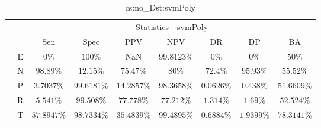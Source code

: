\begin{table}[!ht]
	\centering
	\begin{tabular}{|c|c|c|c|c|c|c|c|c|}
		\cline{3-9}
		\multicolumn{2}{c|}{} & \multicolumn{7}{c|}{Statistics - svmPoly} \\ \cline{3-9}
		\multicolumn{2}{c|}{} & Sen & Spec & PPV & NPV & DR & DP & BA \\ \hline
		\multirow{5}{*}{\rotatebox{90}{Class}} & E & $0\%$ & $100\%$ & NaN & $99.8123\%$ & $0\%$ & $0\%$ & $50\%$ \\ \cline{2-9}
		 & N & $98.89\%$ & $12.15\%$ & $75.47\%$ & $80\%$ & $72.4\%$ & $95.93\%$ & $55.52\%$ \\ \cline{2-9}
		 & P & $3.7037\%$ & $99.6181\%$ & $14.2857\%$ & $98.3658\%$ & $0.0626\%$ & $0.438\%$ & $51.6609\%$ \\ \cline{2-9}
		 & R & $5.541\%$ & $99.508\%$ & $77.778\%$ & $77.212\%$ & $1.314\%$ & $1.69\%$ & $52.524\%$ \\ \cline{2-9}
		 & T & $57.8947\%$ & $98.7334\%$ & $35.4839\%$ & $99.4895\%$ & $0.6884\%$ & $1.9399\%$ & $78.3141\%$ \\ \hline
	\end{tabular}
	\caption{cs:no_Dst:svmPoly}
	\label{tab:cs:no_Dst:svmPoly}
\end{table}
